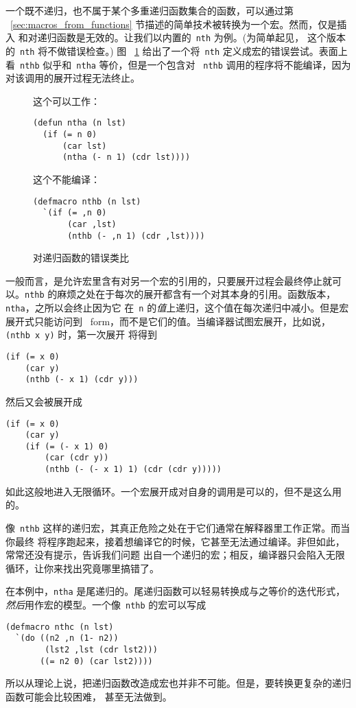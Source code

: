一个既不递归，也不属于某个多重递归函数集合的函数，可以通过第%
~\ref{sec:macros_from_functions} 节描述的简单技术被转换为一个宏。然而，仅是插入
\bq{}和\comma{}对递归函数是无效的。让我们以内置的~\texttt{nth} 为例。(为简单起见，
这个版本的~\texttt{nth} 将不做错误检查。) 图%
~\ref{fig:mistaken_analogy_to_a_recursive_function} 给出了一个将~\texttt{nth}
定义成宏的错误尝试。表面上看~\texttt{nthb} 似乎和~\texttt{ntha} 等价，但是一个包含对
~\texttt{nthb} 调用的程序将不能编译，因为对该调用的展开过程无法终止。

\begin{figure}
  这个可以工作：
\begin{lstlisting}
(defun ntha (n lst)
  (if (= n 0)
      (car lst)
      (ntha (- n 1) (cdr lst))))
\end{lstlisting}
  这个不能编译：
\begin{lstlisting}
(defmacro nthb (n lst)
  `(if (= ,n 0)
       (car ,lst)
       (nthb (- ,n 1) (cdr ,lst))))
\end{lstlisting}
  \caption{对递归函数的错误类比}
  \label{fig:mistaken_analogy_to_a_recursive_function}
\end{figure}

一般而言，是允许宏里含有对另一个宏的引用的，只要展开过程会最终停止就可以。\texttt{nthb}
的麻烦之处在于每次的展开都含有一个对其本身的引用。函数版本，\texttt{ntha}，之所以会终止因为它
在~\texttt{n} 的\emph{值}上递归，这个值在每次递归中减小。但是宏展开式只能访问到
~form，而不是它们的值。当编译器试图宏展开，比如说，\texttt{(nthb x y)} 时，第一次展开
将得到
\begin{lstlisting}
(if (= x 0)
    (car y)
    (nthb (- x 1) (cdr y)))
\end{lstlisting}
然后又会被展开成
\begin{lstlisting}
(if (= x 0)
    (car y)
    (if (= (- x 1) 0)
        (car (cdr y))
        (nthb (- (- x 1) 1) (cdr (cdr y)))))
\end{lstlisting}
如此这般地进入无限循环。一个宏展开成对自身的调用是可以的，但不是这么用的。

像~\texttt{nthb} 这样的递归宏，其真正危险之处在于它们通常在解释器里工作正常。而当你最终
将程序跑起来，接着想编译它的时候，它甚至无法通过编译。非但如此，常常还没有提示，告诉我们问题
出自一个递归的宏；相反，编译器只会陷入无限循环，让你来找出究竟哪里搞错了。

在本例中，\texttt{ntha} 是尾递归的。尾递归函数可以轻易转换成与之等价的迭代形式，
\emph{然后}用作宏的模型。一个像~\texttt{nthb} 的宏可以写成
\begin{lstlisting}
(defmacro nthc (n lst)
  `(do ((n2 ,n (1- n2))
        (lst2 ,lst (cdr lst2)))
       ((= n2 0) (car lst2))))
\end{lstlisting}
所以从理论上说，把递归函数改造成宏也并非不可能。但是，要转换更复杂的递归函数可能会比较困难，
甚至无法做到。

